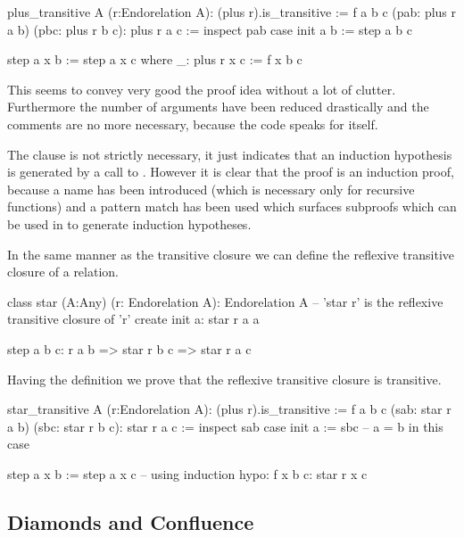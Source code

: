 \begin{alba}
  plus_transitive A (r:Endorelation A): (plus r).is_transitive :=
    f a b c (pab: plus r a b) (pbc: plus r b c): plus r a c :=
      inspect
        pab
      case
        init a b :=
          step a b c

        step a x b :=
          step a x c
            where
              _: plus r x c :=  f x b c
\end{alba}
%
This seems to convey very good the proof idea without a lot of
clutter. Furthermore the number of arguments have been reduced drastically and
the comments are no more necessary, because the code speaks for itself.

The  clause is not strictly necessary, it just indicates that an
induction hypothesis is generated by a call to . However it is clear
that the proof is an induction proof, because a name  has been
introduced (which is necessary only for recursive functions) and a pattern
match has been used which surfaces subproofs which can be used in  to
generate induction hypotheses.



In the same manner as the transitive closure we can define the reflexive
transitive closure of a relation.

\begin{alba}
  class
    star (A:Any) (r: Endorelation A): Endorelation A
      -- 'star r' is the reflexive transitive closure of 'r'
  create
    init a:
      star r a a

    step a b c:
      r a b
      => star r b c
      => star r a c
\end{alba}

Having the definition we prove that the reflexive transitive closure is
transitive.

\begin{alba}
  star_transitive A (r:Endorelation A): (plus r).is_transitive :=
    f a b c (sab: star r a b) (sbc: star r b c): star r a c :=
      inspect
        sab
      case
        init a :=
          sbc
            -- a = b in this case

        step a x b :=
          step a x c
            -- using induction hypo: f x b c: star r x c
\end{alba}


\subsection{Diamonds and Confluence}


